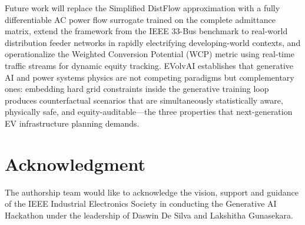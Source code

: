 \documentclass[conference]{IEEEtran}
\begin{document}
Future work will replace the Simplified DistFlow approximation with a fully differentiable AC power flow surrogate trained on the complete admittance matrix, extend the framework from the IEEE 33-Bus benchmark to real-world distribution feeder networks in rapidly electrifying developing-world contexts, and operationalize the Weighted Conversion Potential (WCP) metric using real-time traffic streams for dynamic equity tracking. EVolvAI establishes that generative AI and power systems physics are not competing paradigms but complementary ones: embedding hard grid constraints inside the generative training loop produces counterfactual scenarios that are simultaneously statistically aware, physically safe, and equity-auditable---the three properties that next-generation EV infrastructure planning demands.

\section{Acknowledgment}
The authorship team would like to acknowledge the vision, support and guidance of the IEEE Industrial Electronics Society in conducting the Generative AI Hackathon under the leadership of Daswin De Silva and Lakshitha Gunasekara.
\end{document}
